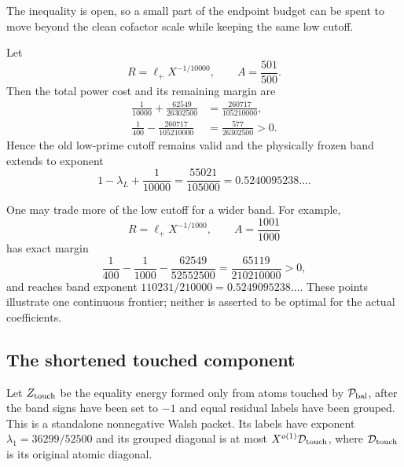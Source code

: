The inequality is open, so a small part of the endpoint budget can be
spent to move beyond the clean cofactor scale while keeping the same
low cutoff.

\begin{corollary}
\label{cor:tpc45-budgeted-band-extension}
Let
\begin{equation}
 R=\ell_+X^{-1/10000},
 \qquad A=\frac{501}{500}.
 \label{eq:tpc45-budgeted-extension-parameters}
\end{equation}
Then the total power cost and its remaining margin are
\begin{align}
 \frac1{10000}+\frac{62549}{26302500}
 &=\frac{260717}{105210000},
 \label{eq:tpc45-budgeted-extension-cost}\\
 \frac1{400}-\frac{260717}{105210000}
 &=\frac{577}{26302500}>0.
 \label{eq:tpc45-budgeted-extension-margin}
\end{align}
Hence the old low-prime cutoff remains valid and the physically frozen
band extends to exponent
\begin{equation}
 1-\lambda_L+\frac1{10000}
 =\frac{55021}{105000}
 =0.5240095238\ldots.
 \label{eq:tpc45-budgeted-extension-endpoint}
\end{equation}
\end{corollary}

One may trade more of the low cutoff for a wider band.  For example,
\begin{equation}
 R=\ell_+X^{-1/1000},
 \qquad A=\frac{1001}{1000}
 \label{eq:tpc45-wider-tradeoff-parameters}
\end{equation}
has exact margin
\begin{equation}
 \frac1{400}-\frac1{1000}
 -\frac{62549}{52552500}
 =\frac{65119}{210210000}>0,
 \label{eq:tpc45-wider-tradeoff-margin}
\end{equation}
and reaches band exponent
\(110231/210000=0.5249095238\ldots\).
These points illustrate one continuous frontier; neither is asserted
to be optimal for the actual coefficients.

\subsection{The shortened touched component}

Let \(Z_{\rm touch}\) be the equality energy formed only from atoms
touched by \(\mathcal P_{\rm bal}\), after the band signs have been set to
\(-1\) and equal residual labels have been grouped.  This is a
standalone nonnegative Walsh packet.  Its labels have exponent
\(\lambda_1=36299/52500\) and its grouped diagonal is at most
\(X^{o(1)}\mathcal D_{\rm touch}\), where \(\mathcal D_{\rm touch}\) is its original
atomic diagonal.

